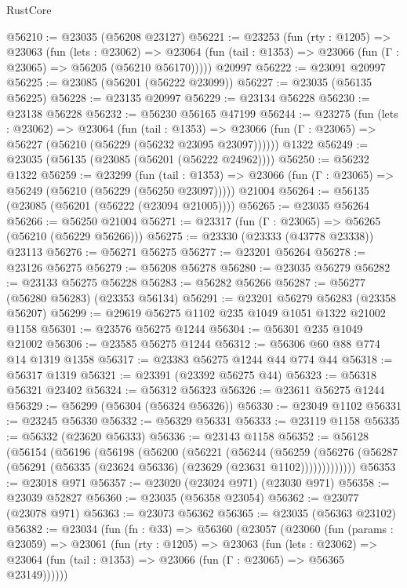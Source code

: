\begin{lexlean}{RustCore}
\begin{coremodule}
@56210 := @23035 (@56208 @23127)
@56221 := @23253
    (fun (rty : @1205) =>
    @23063
      (fun (lets : @23062) =>
      @23064 (fun (tail : @1353) => @23066 (fun (Γ : @23065) => @56205 (@56210 @56170)))))
    @20997
@56222 := @23091 @20997
@56225 := @23085 (@56201 (@56222 @23099))
@56227 := @23035 (@56135 @56225)
@56228 := @23135 @20997
@56229 := @23134 @56228
@56230 := @23138 @56228
@56232 := @56230 @56165 @47199
@56244 := @23275
    (fun (lets : @23062) =>
    @23064
      (fun (tail : @1353) =>
      @23066 (fun (Γ : @23065) => @56227 (@56210 (@56229 (@56232 @23095 @23097))))))
    @1322
@56249 := @23035 (@56135 (@23085 (@56201 (@56222 @24962))))
@56250 := @56232 @1322
@56259 := @23299
    (fun (tail : @1353) => @23066 (fun (Γ : @23065) => @56249 (@56210 (@56229 (@56250 @23097)))))
    @21004
@56264 := @56135 (@23085 (@56201 (@56222 (@23094 @21005))))
@56265 := @23035 @56264
@56266 := @56250 @21004
@56271 := @23317 (fun (Γ : @23065) => @56265 (@56210 (@56229 @56266)))
@56275 := @23330 (@23333 (@43778 @23338)) @23113
@56276 := @56271 @56275
@56277 := @23201 @56264
@56278 := @23126 @56275
@56279 := @56208 @56278
@56280 := @23035 @56279
@56282 := @23133 @56275 @56228
@56283 := @56282 @56266
@56287 := @56277 (@56280 @56283) (@23353 @56134)
@56291 := @23201 @56279 @56283 (@23358 @56207)
@56299 := @29619 @56275 @1102 @235 @1049 @1051 @1322 @21002 @1158
@56301 := @23576 @56275 @1244
@56304 := @56301 @235 @1049 @21002
@56306 := @23585 @56275 @1244
@56312 := @56306 @60 @88 @774 @14 @1319 @1358
@56317 := @23383 @56275 @1244 @44 @774 @44
@56318 := @56317 @1319
@56321 := @23391 (@23392 @56275 @44)
@56323 := @56318 @56321 @23402
@56324 := @56312 @56323
@56326 := @23611 @56275 @1244
@56329 := @56299 (@56304 (@56324 @56326))
@56330 := @23049 @1102
@56331 := @23245 @56330
@56332 := @56329 @56331
@56333 := @23119 @1158
@56335 := @56332 (@23620 @56333)
@56336 := @23143 @1158
@56352 := @56128
    (@56154
      (@56196
        (@56198
          (@56200
            (@56221
              (@56244
                (@56259
                  (@56276 (@56287 (@56291 (@56335 (@23624 @56336) (@23629 (@23631 @1102)))))))))))))
@56353 := @23018 @971
@56357 := @23020 (@23024 @971) (@23030 @971)
@56358 := @23039 @52827
@56360 := @23035 (@56358 @23054)
@56362 := @23077 (@23078 @971)
@56363 := @23073 @56362
@56365 := @23035 (@56363 @23102)
@56382 := @23034
    (fun (fn : @33) =>
    @56360
      (@23057
        (@23060
          (fun (params : @23059) =>
          @23061
            (fun (rty : @1205) =>
            @23063
              (fun (lets : @23062) =>
              @23064 (fun (tail : @1353) => @23066 (fun (Γ : @23065) => @56365 @23149))))))

\end{coremodule}
\end{lexlean}
